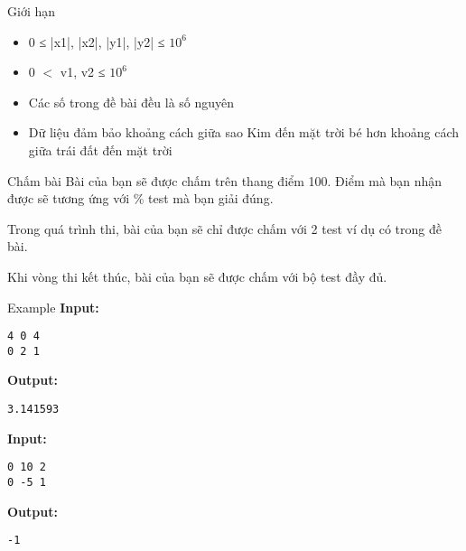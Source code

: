 Giới hạn  
\begin{itemize}
	\item     0 ≤ |x1|, |x2|, |y1|, |y2| ≤ $10^{6}$
	\item     0 $<$ v1, v2 ≤ $10^{6}$
	\item     Các số trong đề bài đều là số nguyên   
	\item      Dữ liệu đảm bảo khoảng cách giữa sao Kim đến mặt trời bé hơn khoảng cách giữa trái đất đến mặt trời    
\end{itemize}
   Chấm bài  
Bài của bạn sẽ được chấm trên thang điểm 100. Điểm mà bạn nhận được sẽ tương ứng với \% test mà bạn giải đúng.  

   Trong quá trình thi, bài của bạn sẽ chỉ được chấm với 2 test ví dụ có trong đề bài.  

   Khi vòng thi kết thúc, bài của bạn sẽ được chấm với bộ test đầy đủ.  
\begin{itemize}
\end{itemize}
   Example  
\textbf{    Input:   }
\begin{verbatim}
4 0 4
0 2 1\end{verbatim}

\textbf{    Output:   }
\begin{verbatim}
3.141593

\end{verbatim}



\textbf{    Input:   }
\begin{verbatim}
0 10 2
0 -5 1\end{verbatim}

\textbf{    Output:   }
\begin{verbatim}
-1\end{verbatim}